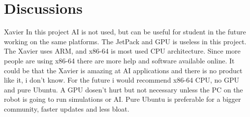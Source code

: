 \chapter{Discussions}

Xavier
In this project AI is not used, but can be useful for student in the future working on the same platforms. The JetPack and GPU is useless in this project. The Xavier uses ARM, and x86-64 is most used CPU architecture. Since more people are using x86-64 there are more help and software available online. 
It could be that the Xavier is amazing at AI applications and there is no product like it, i don't know. For the future i would recommend x86-64 CPU, no GPU and pure Ubuntu. A GPU dosen't hurt but not necessary unless the PC on the robot is going to run simulations or AI. Pure Ubuntu is preferable for a bigger community, faster updates and less bloat. 